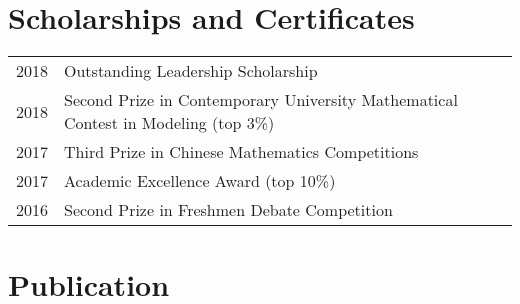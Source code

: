 \documentclass[a4paper,10pt,utf8]{article} %
\begin{document}
\section{Scholarships and Certificates}

\begin{tabular}{r|l}
2018 		& Outstanding Leadership Scholarship \\
2018		& Second Prize in Contemporary University Mathematical Contest in Modeling (top 3\%)\\
2017		& Third Prize in Chinese Mathematics Competitions\\
2017		& Academic Excellence Award (top 10\%) \\
2016		& Second Prize in Freshmen Debate Competition\\
\end{tabular}


%	
%
\section{Publication}
\end{document}
